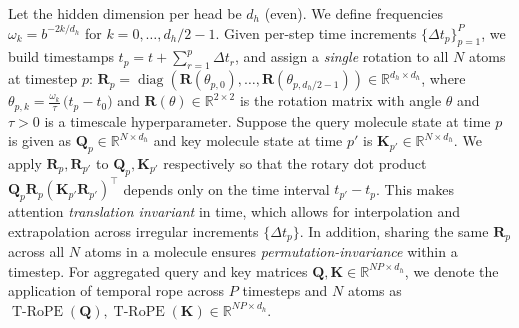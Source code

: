 Let the hidden dimension per head be $d_h$ (even). We define frequencies $\omega_k=b^{-2k/d_h}$ for $k=0,\dots,d_h/2-1$.
Given per-step time increments $\{\Delta t_p\}_{p=1}^{P}$, we build timestamps
$t_p=t+\sum_{r=1}^{p}\Delta t_r$, and assign a \emph{single} rotation to all $N$ atoms at timestep $p$: $\mathbf R_{p}=\operatorname{diag}\left(\mathbf R(\theta_{p,0}),\dots,\mathbf R(\theta_{p,d_h/2-1})\right) \in \mathbb R^{d_h \times d_h}$, where $\theta_{p,k}=\frac{\omega_k}{\tau}\,\bigl(t_p-t_0\bigr)$ and
$\mathbf R(\theta) \in \mathbb R^{2 \times 2}$ is the rotation matrix with angle $\theta$ and $\tau > 0$ is a timescale hyperparameter. Suppose the query molecule state at time $p$ is given as $\mathbf Q_p \in \mathbb R^{N \times d_h}$ and key molecule state at time $p'$ is $\mathbf K_{p'} \in \mathbb R^{N \times d_h}$. We apply $\mathbf R_p, \mathbf R_{p'}$ to $\mathbf Q_p, \mathbf K_{p'}$ respectively so that the rotary dot product $\mathbf Q_p \mathbf R_p (\mathbf K_{p'} \mathbf R_{p'})^\top$  
depends only on the time interval $t_{p'}-t_p$. This makes attention \textit{translation invariant} in time, which allows for interpolation and extrapolation across irregular increments $\{\Delta t_p\}$. In addition, sharing the same $\mathbf R_p$ across all $N$ atoms in a molecule ensures \textit{permutation-invariance} within a timestep.
For aggregated query and key matrices $\mathbf Q, \mathbf K \in \mathbb R^{NP \times d_h}$, we denote the application of temporal \gls{rope} across $P$ timesteps and $N$ atoms as $\operatorname{T-RoPE}(\mathbf Q), \operatorname{T-RoPE}(\mathbf K) \in \mathbb R^{NP \times d_h}$.

